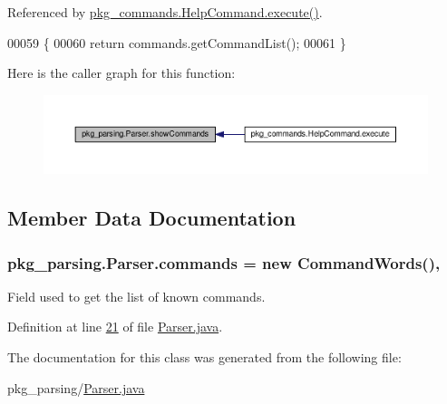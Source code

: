 Referenced by \hyperlink{HelpCommand_8java_source_l00033}{pkg\-\_\-commands.\-Help\-Command.\-execute()}.


\begin{DoxyCode}
00059                                         \{
00060         \textcolor{keywordflow}{return} commands.getCommandList();
00061     \}
\end{DoxyCode}


Here is the caller graph for this function\-:
\nopagebreak
\begin{figure}[H]
\begin{center}
\leavevmode
\includegraphics[width=350pt]{classpkg__parsing_1_1Parser_a31545cdbdb409aaeb727289c0ea7be1b_icgraph}
\end{center}
\end{figure}




\subsection{Member Data Documentation}
\hypertarget{classpkg__parsing_1_1Parser_a0e5263205b63cc2c006361a92558132a}{
\subsubsection[{commands}]{ pkg\-\_\-parsing.\-Parser.\-commands = new {\bf Command\-Words}()\hspace{0.3cm}{\ttfamily [static]}, {\ttfamily [private]}}}\label{classpkg__parsing_1_1Parser_a0e5263205b63cc2c006361a92558132a}


Field used to get the list of known commands. 



Definition at line \hyperlink{Parser_8java_source_l00021}{21} of file \hyperlink{Parser_8java_source}{Parser.\-java}.



The documentation for this class was generated from the following file\-:\begin{DoxyCompactItemize}
\item 
pkg\-\_\-parsing/\hyperlink{Parser_8java}{Parser.\-java}\end{DoxyCompactItemize}
